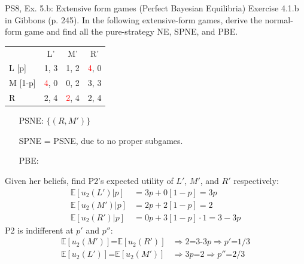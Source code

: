 \begin{frame}{PS8, Ex. 5.b: Extensive form games (Perfect Bayesian Equilibria)}
    Exercise 4.1.b in Gibbons (p. 245). In the following extensive-form games, derive the normal-form game and find all the pure-strategy NE, SPNE, and PBE.
    \vspace{-8pt}
    \begin{multicols}{2}
      \begin{table}
        \begin{tabular}{l|c|c|c|}
          \multicolumn{1}{c}{} & \multicolumn{1}{c}{L'} & \multicolumn{1}{c}{M'} & \multicolumn{1}{c}{R'} \\\cline{2-4}
          L [p]   & 1, \color{blue}3 & 1, 2 & \textcolor{red}{4}, 0 \\\cline{2-4}
          M [1-p] & \textcolor{red}{4}, 0 & 0, 2 & 3, \color{blue}3 \\\cline{2-4}
          R       & 2, \color{blue}4 & \textcolor{red}{2}, \color{blue}4 & 2, \color{blue}4 \\\cline{2-4}
        \end{tabular}
      \end{table} \vspace{-4pt}
      \begin{itemize}
        \item[PSNE:] $\{(R,M')\}$
        \item[SPNE =] PSNE, due to no proper subgames.
        \item[PBE:]
      \end{itemize} \vspace{-4pt}
      Given her beliefs, find P2's expected utility of $L'$, $M'$, and $R'$ respectively: \vspace{-4pt}
      \begin{align*}
        \mathbb{E}[u_2(L')|p]&=3p+0[1-p]=3p\\ \mathbb{E}[u_2(M')|p]&=2p+2[1-p]=2\\
        \mathbb{E}[u_2(R')|p]&=0p+3[1-p]\cdot1=3-3p
      \end{align*}
      P2 is indifferent at $p'$ and $p''$: \vspace{-4pt}
      \begin{align*}
        \mathbb{E}[u_2(M')]\text{=}\mathbb{E}[u_2(R')]&\Rightarrow 2\text{=3-3}p\Rightarrow p'\text{=}1/3\\
        \mathbb{E}[u_2(L')]\text{=}\mathbb{E}[u_2(M')]&\Rightarrow 3p\text{=}2\Rightarrow p''\text{=}2/3\\
      \end{align*}

\end{multicols}
\end{frame}
